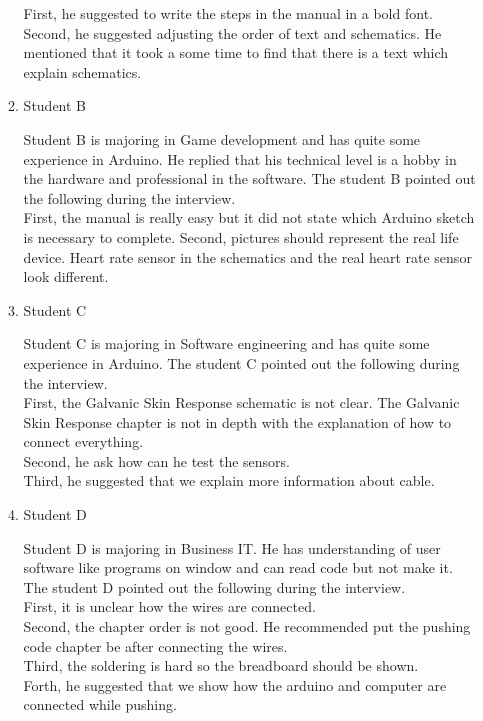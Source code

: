 \documentclass[conference]{IEEEtran}
\begin{document}
\begin{enumerate}
\begin{enumerate}
						First, he suggested to write the steps in the manual in a bold font.\\
						Second, he suggested adjusting the order of text and schematics. He mentioned that it took a some time to find that there is a text which explain schematics. 

					\item Student B

						Student B is majoring in Game development and has  quite some experience in Arduino. He replied that his technical level is a hobby in the hardware and professional in the software. The student B pointed out the following during the interview.\\

						First, the manual is really easy but it did not state which Arduino sketch is necessary to complete.
						Second, pictures should represent the real life device. Heart rate sensor in the schematics and the real heart rate sensor look different.

					\item Student C

						Student C is majoring in Software engineering and has  quite some experience in Arduino. The student C pointed out the following during the interview.\\

						First, the Galvanic Skin Response schematic is not clear. The Galvanic Skin Response chapter is not in depth with the explanation of how to connect everything.\\
						Second, he ask how can he test the sensors.\\
						Third, he suggested that we explain more information about cable.\\

					\item Student D

						Student D is majoring in Business IT. He has understanding of user software like programs on window and can read code but not make it. The student D pointed out the following during the interview.\\

						First, it is unclear how the wires are connected.\\
						Second, the chapter order is not good. He recommended put the pushing code chapter be after connecting the wires.\\
						Third, the soldering is hard so the breadboard should be shown.\\
						Forth, he suggested that we show how the arduino and computer are connected while pushing.\\
	

\end{enumerate}
\end{enumerate}
\end{document}
